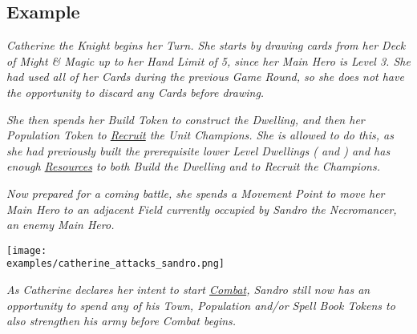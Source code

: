 \begin{multicols}{2}
\subsection*{Example}

\textit{Catherine the Knight begins her Turn. She starts by drawing cards from her Deck of Might \& Magic up to her Hand Limit  of 5, since her Main Hero is Level 3.
She had used all of her Cards during the previous Game Round, so she does not have the opportunity to discard any Cards before drawing.}\par
\textit{She then spends her Build Token to construct the  Dwelling, and then her Population Token to \hyperlink{Units}{Recruit} the  Unit Champions.
She is allowed to do this, as she had previously built the prerequisite lower Level Dwellings ( and ) and has enough \hyperlink{Resources}{Resources} to both Build the Dwelling and to Recruit the Champions.}\par
\textit{Now prepared for a coming battle, she spends a Movement Point to move her Main Hero to an adjacent Field currently occupied by Sandro the Necromancer, an enemy Main Hero.}\par

\texttt{[image: \\examples/catherine\_attacks\_sandro.png]}

\textit{As Catherine declares her intent to start \hyperlink{Combat}{Combat}, Sandro still now has an opportunity to spend any of his Town, Population and/or Spell Book Tokens to also strengthen his army before Combat begins.}

\end{multicols}
